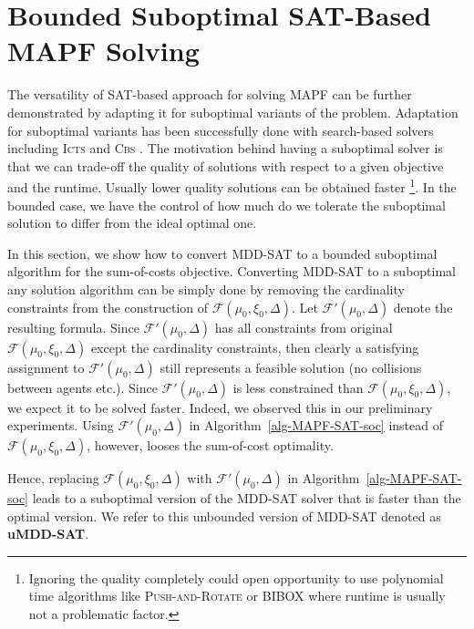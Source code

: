 \documentclass[jair,oneside,11pt]{article}
\begin{document}
\section{Bounded Suboptimal SAT-Based MAPF Solving}
\label{sec:suboptimal}

The versatility of SAT-based approach for solving MAPF can be further demonstrated by adapting it for suboptimal variants of the problem. Adaptation for suboptimal variants has been successfully done with search-based solvers including \textsc{Icts} \cite{DBLP:conf/socs/AljalaudS13} and \textsc{Cbs} \cite{DBLP:conf/ecai/BarerSSF14}. The motivation behind having a suboptimal solver is that we can trade-off the quality of solutions with respect to a given objective and the runtime. Usually lower quality solutions can be obtained faster \footnote{Ignoring the quality completely could open opportunity to use polynomial time algorithms like \textsc{Push-and-Rotate} \cite{DBLP:journals/jair/WildeMW14} or BIBOX \cite{DBLP:conf/icra/Surynek09} where runtime is usually not a problematic factor.}. In the bounded case, we have the control of how much do we tolerate the suboptimal solution to differ from the ideal optimal one.

In this section, we show how to convert MDD-SAT to a bounded suboptimal algorithm for the sum-of-costs objective. Converting MDD-SAT to a suboptimal any solution algorithm can be simply done by removing the cardinality constraints from the construction of $\mathcal{F}(\mu_0,\xi_0,\Delta)$. Let $\mathcal{F'}(\mu_0, \Delta)$ denote the resulting formula.  Since $\mathcal{F'}(\mu_0,\Delta)$ has all constraints from original $\mathcal{F}(\mu_0,\xi_0,\Delta)$ except the cardinality constraints, then clearly a satisfying assignment to $\mathcal{F'}(\mu_0, \Delta)$ still represents a feasible solution (no collisions between agents etc.). Since $\mathcal{F'}(\mu_0, \Delta)$ is less constrained than $\mathcal{F}(\mu_0,\xi_0, \Delta)$, we expect it to be solved faster. Indeed, we observed this in our preliminary experiments. Using $\mathcal{F'}(\mu_0, \Delta)$ in Algorithm~\ref{alg-MAPF-SAT-soc} instead of $\mathcal{F}(\mu_0,\xi_0, \Delta)$, however, looses the sum-of-cost optimality. 

Hence, replacing $\mathcal{F}(\mu_0,\xi_0, \Delta)$ with $\mathcal{F'}(\mu_0, \Delta)$ in Algorithm~\ref{alg-MAPF-SAT-soc} leads to a suboptimal version of the MDD-SAT solver that is faster than the optimal version. We refer to this unbounded version of MDD-SAT denoted as {\bf uMDD-SAT}.
\end{document}
